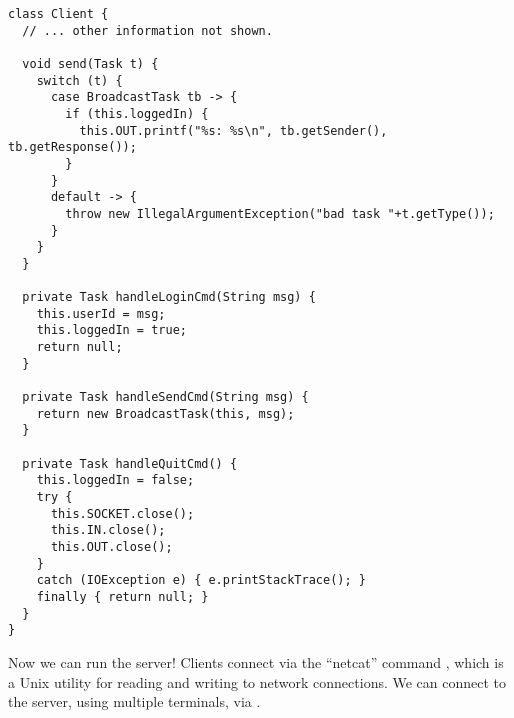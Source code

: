 \begin{lstlisting}[language=MyJava]
class Client {
  // ... other information not shown.

  void send(Task t) {
    switch (t) {
      case BroadcastTask tb -> {
        if (this.loggedIn) { 
          this.OUT.printf("%s: %s\n", tb.getSender(), tb.getResponse()); 
        }
      }
      default -> {
        throw new IllegalArgumentException("bad task "+t.getType());
      }
    }
  }

  private Task handleLoginCmd(String msg) {
    this.userId = msg;
    this.loggedIn = true;
    return null;
  }

  private Task handleSendCmd(String msg) {
    return new BroadcastTask(this, msg);
  }

  private Task handleQuitCmd() {
    this.loggedIn = false;
    try {
      this.SOCKET.close();
      this.IN.close();
      this.OUT.close();
    } 
    catch (IOException e) { e.printStackTrace(); }
    finally { return null; }
  }
}
\end{lstlisting}

Now we can run the server! 
Clients connect via the ``netcat'' command , which is a Unix utility for reading and writing to network connections. 
We can connect to the server, using multiple terminals, via .
